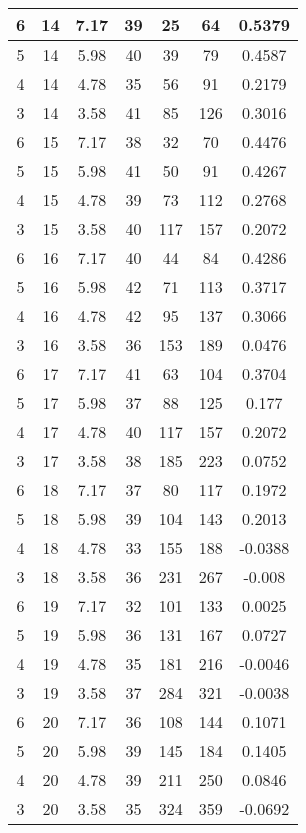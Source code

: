\documentclass[letterpaper, 12pt]{article}
\begin{document}
\begin{longtable}{|c|c|c|c|c|c|c|}
\hline
6 & 14 & 7.17 & 39 & 25 & 64 & 0.5379 \\
\hline
5 & 14 & 5.98 & 40 & 39 & 79 & 0.4587 \\
\hline
4 & 14 & 4.78 & 35 & 56 & 91 & 0.2179 \\
\hline
3 & 14 & 3.58 & 41 & 85 & 126 & 0.3016 \\
\hline
6 & 15 & 7.17 & 38 & 32 & 70 & 0.4476 \\
\hline
5 & 15 & 5.98 & 41 & 50 & 91 & 0.4267 \\
\hline
4 & 15 & 4.78 & 39 & 73 & 112 & 0.2768 \\
\hline
3 & 15 & 3.58 & 40 & 117 & 157 & 0.2072 \\
\hline
6 & 16 & 7.17 & 40 & 44 & 84 & 0.4286 \\
\hline
5 & 16 & 5.98 & 42 & 71 & 113 & 0.3717 \\
\hline
4 & 16 & 4.78 & 42 & 95 & 137 & 0.3066 \\
\hline
3 & 16 & 3.58 & 36 & 153 & 189 & 0.0476 \\
\hline
6 & 17 & 7.17 & 41 & 63 & 104 & 0.3704 \\
\hline
5 & 17 & 5.98 & 37 & 88 & 125 & 0.177 \\
\hline
4 & 17 & 4.78 & 40 & 117 & 157 & 0.2072 \\
\hline
3 & 17 & 3.58 & 38 & 185 & 223 & 0.0752 \\
\hline
6 & 18 & 7.17 & 37 & 80 & 117 & 0.1972 \\
\hline
5 & 18 & 5.98 & 39 & 104 & 143 & 0.2013 \\
\hline
4 & 18 & 4.78 & 33 & 155 & 188 & -0.0388 \\
\hline
3 & 18 & 3.58 & 36 & 231 & 267 & -0.008 \\
\hline
6 & 19 & 7.17 & 32 & 101 & 133 & 0.0025 \\
\hline
5 & 19 & 5.98 & 36 & 131 & 167 & 0.0727 \\
\hline
4 & 19 & 4.78 & 35 & 181 & 216 & -0.0046 \\
\hline
3 & 19 & 3.58 & 37 & 284 & 321 & -0.0038 \\
\hline
6 & 20 & 7.17 & 36 & 108 & 144 & 0.1071 \\
\hline
5 & 20 & 5.98 & 39 & 145 & 184 & 0.1405 \\
\hline
4 & 20 & 4.78 & 39 & 211 & 250 & 0.0846 \\
\hline
3 & 20 & 3.58 & 35 & 324 & 359 & -0.0692 \\
\hline
\end{longtable}
\end{document}
